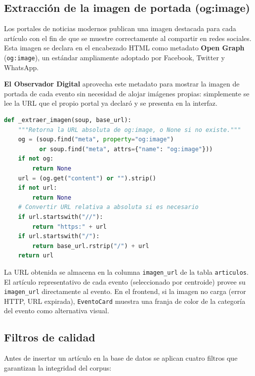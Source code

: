 \documentclass[12pt,a4paper]{article}
\begin{document}
\subsection{Extracción de la imagen de portada (og:image)}

Los portales de noticias modernos publican una imagen destacada para cada artículo con el fin de que se muestre correctamente al compartir en redes sociales. Esta imagen se declara en el encabezado HTML como metadato \textbf{Open Graph} (\texttt{og:image}), un estándar ampliamente adoptado por Facebook, Twitter y WhatsApp.

\textbf{El Observador Digital} aprovecha este metadato para mostrar la imagen de portada de cada evento sin necesidad de alojar imágenes propias: simplemente se lee la URL que el propio portal ya declaró y se presenta en la interfaz.

\begin{lstlisting}[language=Python, caption=Extracción de imagen og:image (article.py)]
def _extraer_imagen(soup, base_url):
    """Retorna la URL absoluta de og:image, o None si no existe."""
    og = (soup.find("meta", property="og:image")
          or soup.find("meta", attrs={"name": "og:image"}))
    if not og:
        return None
    url = (og.get("content") or "").strip()
    if not url:
        return None
    # Convertir URL relativa a absoluta si es necesario
    if url.startswith("//"):
        return "https:" + url
    if url.startswith("/"):
        return base_url.rstrip("/") + url
    return url
\end{lstlisting}

La URL obtenida se almacena en la columna \texttt{imagen\_url} de la tabla \texttt{articulos}. El artículo representativo de cada evento (seleccionado por centroide) provee su \texttt{imagen\_url} directamente al evento. En el frontend, si la imagen no carga (error HTTP, URL expirada), \texttt{EventoCard} muestra una franja de color de la categoría del evento como alternativa visual.

\subsection{Filtros de calidad}

Antes de insertar un artículo en la base de datos se aplican cuatro filtros que garantizan la integridad del corpus:
\end{document}
